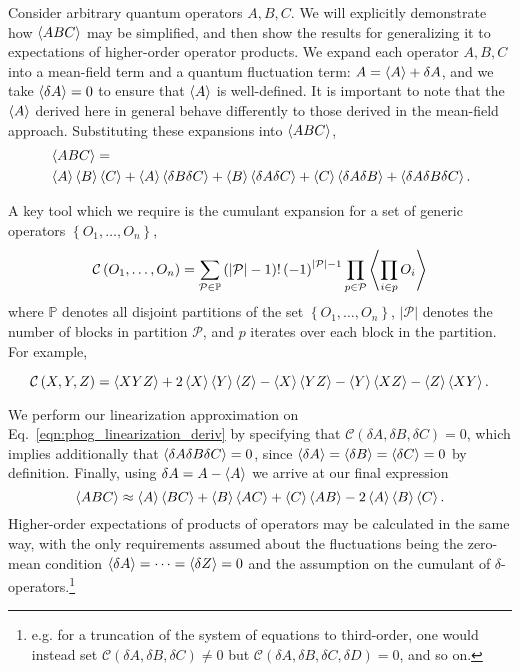 Consider arbitrary quantum operators $A, B, C$. We will explicitly demonstrate how $\ev{ABC}$ may be simplified, and then show the results for generalizing it to expectations of higher-order operator products. We expand each operator $A, B, C$ into a mean-field term and a quantum fluctuation term: $A = \ev{A} + \delta A$, and we take $\ev{\delta A} = 0$ to ensure that $\ev{A}$ is well-defined. It is important to note that the $\ev{A}$ derived here in general behave differently to those derived in the mean-field approach. Substituting these expansions into $\ev{A B C}$,
\begin{align}\label{eqn:phog_linearization_deriv}
&\ev{A B C} = \notag \\
%
&\ev{A}\ev{B}\ev{C} + \ev{A}\ev{\delta B \delta C} + \ev{B} \ev{\delta A \delta C} + \ev{C} \ev{\delta A \delta B} + \ev{\delta A \delta B \delta C}.
\end{align}

\noindent A key tool which we require is the cumulant expansion for a set of generic operators $\left\{ O_1, \dots, O_n\right\}$, 
\begin{equation}
\mathcal{C}\left(O_1, \dots, O_n\right) = \sum_{\mathcal{P}\in \mathbb{P}} \left(\left|\mathcal{P}\right| - 1\right)! \left(-1\right)^{\left|\mathcal{P}\right|-1} \prod_{p \in \mathcal{P}} \ev{\prod_{i \in p} O_i}
\end{equation}
where $\mathbb{P}$ denotes all disjoint partitions of the set $\left\{O_1, \dots, O_n\right\}$, $\left| \mathcal{P}\right|$ denotes the number of blocks in partition $\mathcal{P}$, and $p$ iterates over each block in the partition. For example,

\begin{equation}
\mathcal{C} \left(X, Y, Z\right) = \ev{X Y Z} + 2 \ev{X}\ev{Y}\ev{Z} - \ev{X}\ev{Y Z} - \ev{Y}\ev{X Z} - \ev{Z}\ev{X Y}.
\end{equation}

\noindent We perform our linearization approximation on Eq.~\ref{eqn:phog_linearization_deriv} by specifying that $\mathcal{C}\left(\delta A, \delta B, \delta C \right) = 0$, which implies additionally that $\ev{\delta A \delta B \delta C} = 0$, since $\ev{\delta A} = \ev{\delta B} = \ev{\delta C} = 0$ by definition. Finally, using $\delta A = A - \ev{A}$ we arrive at our final expression
\begin{equation}\label{eqn:linearization_3}
\ev{A B C} \approx \ev{A} \ev{B C} + \ev{B} \ev{A C} + \ev{C} \ev{A B} - 2 \ev{A} \ev{B} \ev{C}.
\end{equation}
Higher-order expectations of products of operators may be calculated in the same way, with the only requirements assumed about the fluctuations being the zero-mean condition $\ev{\delta A} = \dots = \ev{\delta Z} = 0$ and the assumption on the cumulant of $\delta$-operators.\footnote{e.g. for a truncation of the system of equations to third-order, one would instead set $\mathcal{C}\left(\delta A, \delta B, \delta C\right) \ne 0$ but $\mathcal{C}\left(\delta A, \delta B, \delta C , \delta D\right) = 0$, and so on.}

